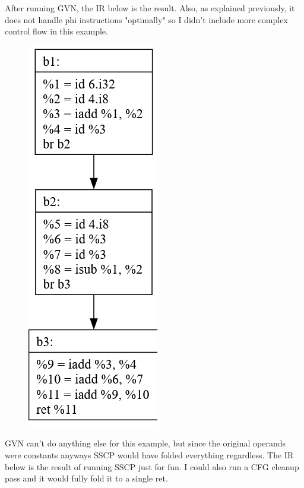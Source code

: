 \documentclass[11pt, a4paper, titlepage]{article}
\begin{document}
After running GVN, the IR below is the result. Also, as explained previously, it does not handle phi instructions "optimally" so I didn't include more complex control flow in this example.

\begin{figure}[H]
  \centering
  \includegraphics[scale=0.3]{images/i19.png}
\end{figure}

GVN can't do anything else for this example, but since the original operands were constants anyways SSCP would have folded everything regardless. The IR below is the result of running SSCP just for fun. I could also run a CFG cleanup pass and it would fully fold it to a single ret.
\end{document}
